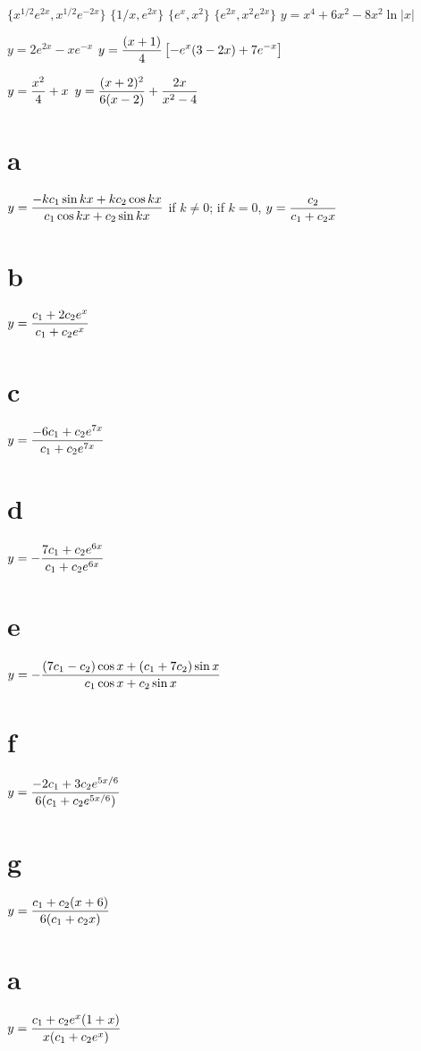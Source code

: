  $\{x^{1/2}e^{2x},x^{1/2}e^{-2x}\}$
 $\{1/x,e^{2x}\}$
   $\{e^{x},x^{2}\}$
 $\{e^{2x},x^{2}e^{2x}\}$
 $y=x^{4}+6x^{2}-8x^{2}\ln|x|$

 $y=2e^{2x}-xe^{-x}$
$y=\displaystyle\frac{(x+1)}{4}\left[-e^{x}(3-2x)+7e^{-x}\right]$

 $y=\displaystyle\frac{x^{2}}{4}+x$
$y=\displaystyle{\frac{(x+2)^{2}}{6(x-2)}+\frac{2x}{x^{2}-4}}$

\part{a} $y=\displaystyle\frac{-kc_{1}\sin kx+kc_{2}\cos kx}{c_{1}
\cos kx+c_{2}\sin kx}$ if $k\ne0$; if $k=0$, $y=\displaystyle\frac{c_{2}}{c_{1}+c_{2}x}$
\;  \part{b} $y=\displaystyle\frac{c_{1}+2c_{2}e^{x}}{c_{1}+c_{2}e^{x}}$\\ [2\jot]

\quad \quad \part{c} $y=\displaystyle\frac{-6c_{1}+c_{2}e^{7x}}{c_{1}+c_{2}e^{7x}}$
\;  \part{d} $y=-\displaystyle\frac{7c_{1}+c_{2}e^{6x}}{c_{1}+c_{2}e^{6x}}$

\quad \quad \part{e} $y=-\displaystyle\frac{(7c_{1}-c_{2})\cos x+(c_{1}+7c_{2})\sin
x}{c_{1}\cos x+c_{2}\sin x}$

\quad \quad \part{f} $y=\displaystyle\frac{-2c_{1}+3c_{2}e^{5x/6}}{6(c_{1}+c_{2}e^{5x/6})}$
\;  \part{g} $y=\displaystyle\frac{c_{1}+c_{2}(x+6)}{6(c_{1}+c_{2}x)}$

\part{a} $y=\displaystyle{\frac{c_{1}+c_{2}e^{x}(1+x)}{x(c_{1}+c_{2}e^{x})}}$\;
